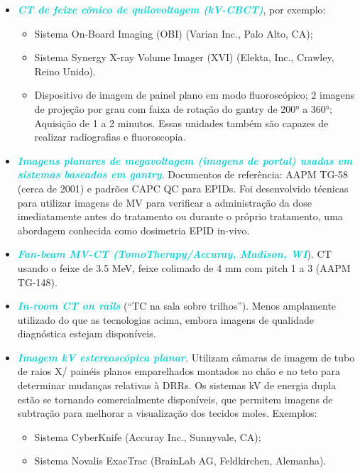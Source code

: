 \documentclass[11pt,a4paper]{article}
\newcounter{exemplo}
\begin{document}
    \begin{itemize}[label=\textcolor{CarnationPink}{$\blacktriangleright$}]
        \item \textcolor{DarkTurquoise}{\textbf{\textit{CT de feixe cônico de quilovoltagem (kV-CBCT)}}}, por exemplo:
        \begin{itemize}[label=\textcolor{CarnationPink}{$\star$}]
            \item Sistema On-Board Imaging (OBI) (Varian Inc., Palo Alto, CA);
            \item Sistema Synergy X-ray Volume Imager (XVI) (Elekta, Inc., Crawley, Reino Unido).
            \item  Dispositivo de imagem de painel plano em modo fluoroscópico; 2 imagens de projeção por grau com faixa de rotação do gantry de \ang{200} a \ang{360}; Aquisição de 1 a 2 minutos. Essas unidades também são capazes de realizar radiografias e fluoroscopia.
        \end{itemize}
        
        \item \textcolor{DarkTurquoise}{\textbf{\textit{Imagens planares de megavoltagem (imagens de portal) usadas em sistemas baseados em gantry}}}. Documentos de referência: AAPM TG-58 (cerca de 2001) e padrões CAPC QC para EPIDs. Foi desenvolvido técnicas para utilizar imagens de MV para verificar a administração da dose imediatamente antes do tratamento ou durante o próprio tratamento, uma abordagem conhecida como dosimetria EPID in-vivo.
        
        \item \textcolor{DarkTurquoise}{\textbf{\textit{Fan-beam MV-CT (TomoTherapy/Accuray, Madison, WI}}}). CT usando o feixe de 3.5 MeV, feixe colimado de 4 mm com pitch 1 a 3 (AAPM TG-148).
        
        \item \textcolor{DarkTurquoise}{\textbf{\textit{In-room CT on rails}}} (``TC na sala sobre trilhos''). Menos amplamente utilizado do que as tecnologias acima, embora imagens de qualidade diagnóstica estejam disponíveis. 
        
        \item \textcolor{DarkTurquoise}{\textbf{\textit{Imagem kV estereoscópica planar}}}. Utilizam câmaras de imagem de tubo de raios X/ painéis planos emparelhados montados no chão e no teto para determinar mudanças relativas à DRRs. Os sistemas kV de energia dupla estão se tornando comercialmente disponíveis, que permitem imagens de subtração para melhorar a visualização dos tecidos moles. Exemplos:
        \begin{itemize}[label=\textcolor{CarnationPink}{$\star$}]
            \item Sistema CyberKnife (Accuray Inc., Sunnyvale, CA);
            \item Sistema Novalis ExacTrac (BrainLab AG, Feldkirchen, Alemanha).
        \end{itemize}
        

\end{itemize}
\end{document}
